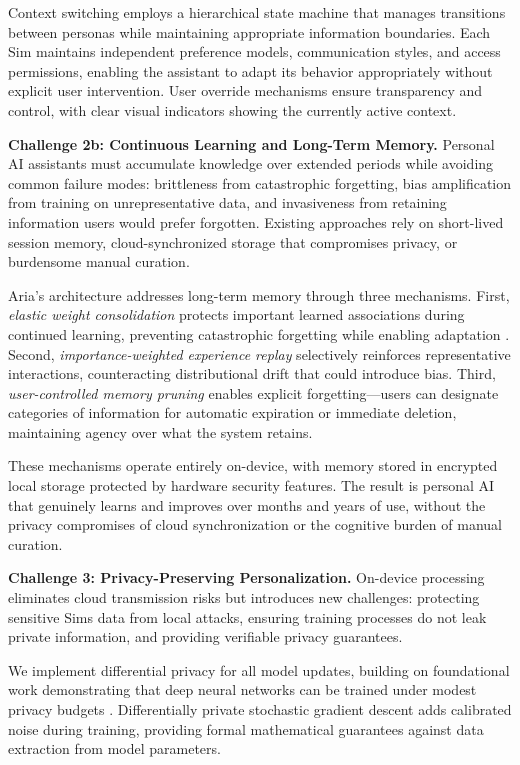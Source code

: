 \documentclass[11pt]{article}
\begin{document}
Context switching employs a hierarchical state machine that manages transitions between personas while maintaining appropriate information boundaries. Each Sim maintains independent preference models, communication styles, and access permissions, enabling the assistant to adapt its behavior appropriately without explicit user intervention. User override mechanisms ensure transparency and control, with clear visual indicators showing the currently active context.

\textbf{Challenge 2b: Continuous Learning and Long-Term Memory.}
Personal AI assistants must accumulate knowledge over extended periods while 
avoiding common failure modes: brittleness from catastrophic forgetting, 
bias amplification from training on unrepresentative data, and invasiveness 
from retaining information users would prefer forgotten. Existing approaches 
rely on short-lived session memory, cloud-synchronized storage that 
compromises privacy, or burdensome manual curation.

Aria's architecture addresses long-term memory through three mechanisms. 
First, \textit{elastic weight consolidation} protects important learned 
associations during continued learning, preventing catastrophic forgetting 
while enabling adaptation \cite{kirkpatrick2017overcoming}. Second, 
\textit{importance-weighted experience replay} selectively reinforces 
representative interactions, counteracting distributional drift that could 
introduce bias. Third, \textit{user-controlled memory pruning} enables 
explicit forgetting---users can designate categories of information for 
automatic expiration or immediate deletion, maintaining agency over what 
the system retains.

These mechanisms operate entirely on-device, with memory stored in encrypted 
local storage protected by hardware security features. The result is 
personal AI that genuinely learns and improves over months and years of 
use, without the privacy compromises of cloud synchronization or the 
cognitive burden of manual curation.

\textbf{Challenge 3: Privacy-Preserving Personalization.}
On-device processing eliminates cloud transmission risks but introduces new 
challenges: protecting sensitive Sims data from local attacks, ensuring 
training processes do not leak private information, and providing verifiable 
privacy guarantees.

We implement differential privacy for all model updates, building on 
foundational work demonstrating that deep neural networks can be trained 
under modest privacy budgets \cite{abadi2016deep}. Differentially private 
stochastic gradient descent adds calibrated noise during training, providing 
formal mathematical guarantees against data extraction from model parameters.
\end{document}
